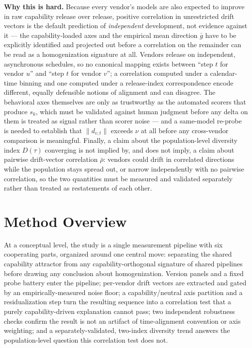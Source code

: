 \documentclass[11pt]{article}
\begin{document}
\noindent\textbf{Why this is hard.} Because every vendor's models are also expected to improve in raw capability release over release, positive correlation in unrestricted drift vectors is the default prediction of \emph{independent} development, not evidence against it --- the capability-loaded axes and the empirical mean direction $\bar{g}$ have to be explicitly identified and projected out before a correlation on the remainder can be read as a homogenization signature at all. Vendors release on independent, asynchronous schedules, so no canonical mapping exists between ``step $t$ for vendor $u$'' and ``step $t$ for vendor $v$''; a correlation computed under a calendar-time binning and one computed under a release-index correspondence encode different, equally defensible notions of alignment and can disagree. The behavioral axes themselves are only as trustworthy as the automated scorers that produce $s_k$, which must be validated against human judgment before any delta on them is treated as signal rather than scorer noise --- and a same-model re-probe is needed to establish that $\|d_{v,t}\|$ exceeds $\nu$ at all before any cross-vendor comparison is meaningful. Finally, a claim about the population-level diversity index $D(\tau)$ converging is not implied by, and does not imply, a claim about pairwise drift-vector correlation $\bar{\rho}$: vendors could drift in correlated directions while the population stays spread out, or narrow independently with no pairwise correlation, so the two quantities must be measured and validated separately rather than treated as restatements of each other.

\section{Method Overview}

At a conceptual level, the study is a single measurement pipeline with six cooperating parts, organized around one central move: separating the shared capability attractor from any capability-orthogonal signature of shared pipelines before drawing any conclusion about homogenization. Version panels and a fixed probe battery enter the pipeline; per-vendor drift vectors are extracted and gated by an empirically-measured noise floor; a capability/neutral axis partition and a residualization step turn the resulting sequence into a correlation test that a purely capability-driven explanation cannot pass; two independent robustness checks confirm the result is not an artifact of time-alignment convention or axis weighting; and a separately-validated, two-index diversity trend answers the population-level question this correlation test does not.
\end{document}

